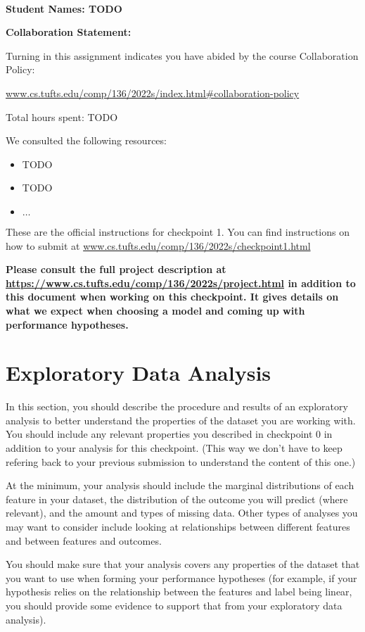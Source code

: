 \documentclass[12pt]{article}
\begin{document}
~~\\ %

{\Large{\bf Student Names: TODO}}


{\Large{\bf Collaboration Statement:}}

Turning in this assignment indicates you have abided by the course Collaboration Policy:

\url{www.cs.tufts.edu/comp/136/2022s/index.html#collaboration-policy}

Total hours spent: TODO

We consulted the following resources:
\begin{itemize}
\item TODO
\item TODO
\item $\ldots$	
\end{itemize}

\newpage

These are the official instructions for checkpoint 1.  You can find instructions on how to submit at \url{www.cs.tufts.edu/comp/136/2022s/checkpoint1.html}

\textbf{Please consult the full project description at \url{https://www.cs.tufts.edu/comp/136/2022s/project.html} in addition to this document when working on this checkpoint.  It gives details on what we expect when choosing a model and coming up with performance hypotheses.}

\section{Exploratory Data Analysis}

In this section, you should describe the procedure and results of an exploratory analysis to better understand the properties of the dataset you are working with.  You should include any relevant properties you described in checkpoint 0 in addition to your analysis for this checkpoint.  (This way we don't have to keep refering back to your previous submission to understand the content of this one.)  

At the minimum, your analysis should include the marginal distributions of each feature in your dataset, the distribution of the outcome you will predict (where relevant), and the amount and types of missing data.  Other types of analyses you may want to consider include looking at relationships between different features and between features and outcomes.  

You should make sure that your analysis covers any properties of the dataset that you want to use when forming your performance hypotheses (for example, if your hypothesis relies on the relationship between the features and label being linear, you should provide some evidence to support that from your exploratory data analysis).
\end{document}
